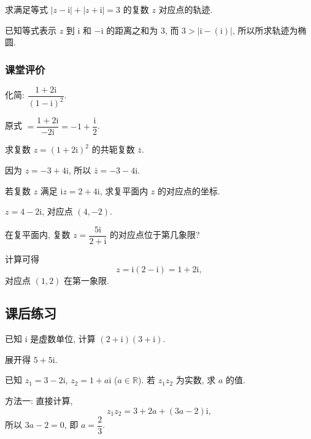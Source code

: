 \lianxi
\begin{exercise}[s]
    求满足等式 $|z-\mathrm{i}|+|z+\mathrm{i}|=3$ 的复数 $z$ 对应点的轨迹.
\end{exercise}
\beginsolution
    已知等式表示 $z$ 到 $\mathrm{i}$ 和 $-\mathrm{i}$ 的距离之和为 $3$, 而 $3> |\mathrm{i}- (\mathrm{i})|$, 所以所求轨迹为椭圆.
\endsolution

\subsubsection{课堂评价}
\begin{exercise}
    化简: $\dfrac{1+2\mathrm{i}}{(1-\mathrm{i})^2}$.
\end{exercise}
\beginsolution
    原式 $= \dfrac{1+2\mathrm{i}}{-2\mathrm{i}}= -1+\dfrac{\mathrm{i}}2$.
\endsolution

\begin{exercise}
    求复数 $z= (1+2\mathrm{i})^2$ 的共轭复数 $\bar{z}$.
\end{exercise}
\beginsolution
    因为 $z= -3+4\mathrm{i}$, 所以 $\bar{z}= -3-4\mathrm{i}$.
\endsolution

\begin{exercise}
    若复数 $z$ 满足 $\mathrm{i}z=2+4\mathrm{i}$, 求复平面内 $z$ 的对应点的坐标.
\end{exercise}
\beginsolution
    $z= 4-2\mathrm{i}$, 对应点 $(4,-2)$.
\endsolution

\begin{exercise}
    在复平面内, 复数 $z= \dfrac{5\mathrm{i}}{2+\mathrm{i}}$ 的对应点位于第几象限?
\end{exercise}
\beginsolution
    计算可得
    \[z= \mathrm{i}(2-\mathrm{i})= 1+2\mathrm{i},\]
    对应点 $(1,2)$ 在第一象限.
\endsolution

\subsection{课后练习}
\begin{exercise}
    已知 $\mathrm{i}$ 是虚数单位, 计算 $(2+\mathrm{i})(3+\mathrm{i})$.
\end{exercise}
\beginsolution
    展开得 $5+5\mathrm{i}$.
\endsolution

\begin{exercise}
    已知 $z_1= 3-2\mathrm{i}$, $z_2= 1+a\mathrm{i}$ ($a\in\mathbb{R}$). 若 $z_1z_2$ 为实数, 求 $a$ 的值.
\end{exercise}
\beginsolution
    方法一: 直接计算,
    \[z_1z_2= 3+2a+ (3a-2)\mathrm{i},\]
    所以 $3a-2=0$, 即 $a= \dfrac23$.


